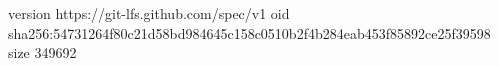 version https://git-lfs.github.com/spec/v1
oid sha256:54731264f80c21d58bd984645c158c0510b2f4b284eab453f85892ce25f39598
size 349692

